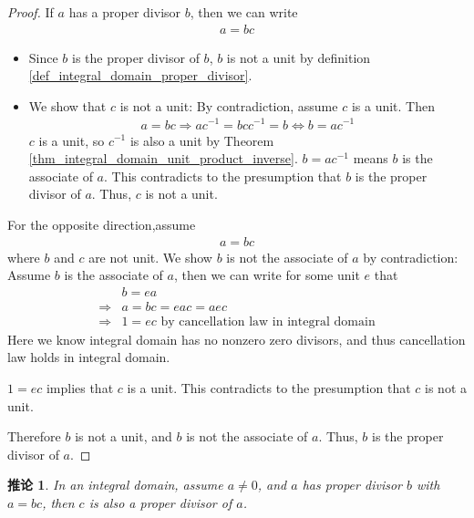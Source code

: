 \documentclass[utf8]{ctexbook}
\newtheorem{corollary}{推论}[section]
\begin{document}
\begin{proof}
If $a$ has a proper divisor $b$, then we can write
\begin{align*}
a = bc
\end{align*}
\begin{itemize}
\item{Since $b$ is the proper divisor of $b$, $b$ is not a unit by definition \ref{def_integral_domain_proper_divisor}. }
\item{We show that $c$ is not a unit: By contradiction, assume $c$ is a unit. Then 
\begin{align*}
a = bc \Longrightarrow a c^{-1} = b c c^{-1} = b \Longleftrightarrow b = a c^{-1}
\end{align*} 
$c$ is a unit, so $c^{-1}$ is also a unit by Theorem  \ref{thm_integral_domain_unit_product_inverse}. $b = a c^{-1}$ means $b$ is the associate of $a$. This contradicts to the presumption that $b$ is the proper divisor of $a$. Thus, $c$ is not a unit.}
\end{itemize}

For the opposite direction,assume
\begin{align*}
a = bc
\end{align*}
where $b$ and $c$ are not unit. We show $b$ is not the associate of $a$ by contradiction: Assume $b$ is the associate of $a$, then we can write for some unit $e$ that
\begin{align*}
& b = e a \\
 \Longrightarrow & a = bc = e a c = a ec \\
\Longrightarrow & 1 = ec \mbox{ by cancellation law in integral domain}
\end{align*}
Here we know integral domain has no nonzero zero divisors, and thus cancellation law holds in integral domain.

$1 = ec $ implies that $c$ is a unit. This contradicts to the presumption that $c$ is not a unit.

Therefore $b$ is not a unit, and $b$ is not the associate of $a$. Thus, $b$ is the proper divisor of $a$.
\end{proof}

\begin{corollary}\label{corollary_integral_domain_proper_divisor_redef}
In an integral domain, assume $a \neq 0$, and $a$ has proper divisor $b$ with $a = bc$, then $c$ is also a proper divisor of $a$.
\end{corollary}
\end{document}

